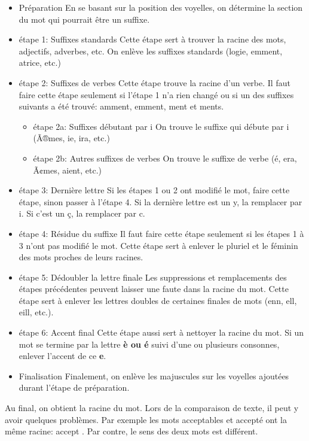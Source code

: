\begin{itemize}
\item{Pr\'eparation}
En se basant sur la position des voyelles, on d\'etermine la section du mot qui pourrait \^etre un suffixe.
\item{\'etape 1: Suffixes standards}
Cette \'etape sert \`a trouver la racine des mots, adjectifs, adverbes, etc.
On enl\`eve les suffixes standards (logie, emment, atrice, etc.)
\item{\'etape 2: Suffixes de verbes}
Cette \'etape trouve la racine d'un verbe.
Il faut faire cette \'etape seulement si l'\'etape 1 n'a rien chang\'e ou si un des suffixes suivants a \'et\'e trouv\'e: amment, emment, ment et ments.
\begin{itemize}
\item{\'etape 2a: Suffixes d\'ebutant par i}
On trouve le suffixe qui d\'ebute par i (Ã®mes, ie, ira, etc.)
\item{\'etape 2b: Autres suffixes de verbes}
On trouve le suffixe de verbe (\'e, era, Ã¢mes, aient, etc.)
\end{itemize}
\item{\'etape 3: Derni\`ere lettre}
Si les \'etapes 1 ou 2 ont modifi\'e le mot, faire cette \'etape, sinon passer \`a l'\'etape 4.
Si la derni\`ere lettre est un y, la remplacer par i.
Si c'est un \c{c}, la remplacer par c.
\item{\'etape 4: R\'esidue du suffixe}
Il faut faire cette \'etape seulement si les \'etapes 1 \`a 3 n'ont pas modifi\'e le mot.
Cette \'etape sert \`a enlever le pluriel et le f\'eminin des mots proches de leurs racines.
\item{\'etape 5: D\'edoubler la lettre finale}
Les suppressions et remplacements des \'etapes pr\'ec\'edentes peuvent laisser une faute dans la racine du mot.
Cette \'etape sert \`a enlever les lettres doubles de certaines finales de mots (enn, ell, eill, etc.).
\item{\'etape 6: Accent final}
Cette \'etape aussi sert \`a nettoyer la racine du mot.
Si un mot se termine par la lettre \textbf{\`e ou \'e} suivi d'une ou plusieurs consonnes, enlever l'accent de ce \textbf{e}.
\item{Finalisation}
Finalement, on enl\`eve les majuscules sur les voyelles ajout\'ees durant l'\'etape de pr\'eparation.
\end{itemize}
Au final, on obtient la racine du mot.
Lors de la comparaison de texte, il peut y avoir quelques probl\`emes.
Par exemple les mots \og acceptables \fg{} et \og accept\'e \fg{} ont la m\^eme racine: \og accept \fg{}.
Par contre, le sens des deux mots est diff\'erent.

